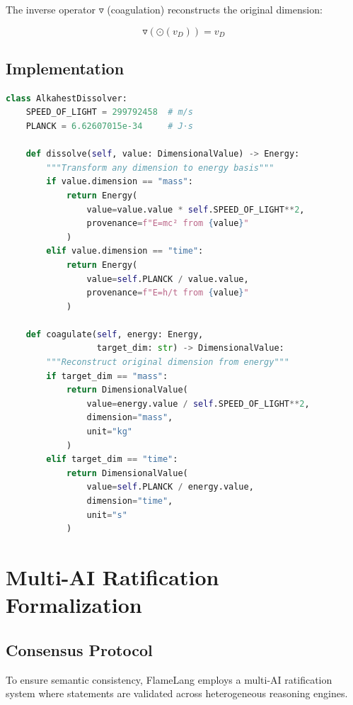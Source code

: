 \documentclass[11pt,a4paper]{article}
\begin{document}
The inverse operator $\triangledown$ (coagulation) reconstructs the original dimension:

\begin{equation}
\triangledown(\odot(v_D)) = v_D
\end{equation}

\subsection{Implementation}

\begin{lstlisting}[language=Python, caption=Alkahest Dissolution]
class AlkahestDissolver:
    SPEED_OF_LIGHT = 299792458  # m/s
    PLANCK = 6.62607015e-34     # J⋅s
    
    def dissolve(self, value: DimensionalValue) -> Energy:
        """Transform any dimension to energy basis"""
        if value.dimension == "mass":
            return Energy(
                value=value.value * self.SPEED_OF_LIGHT**2,
                provenance=f"E=mc² from {value}"
            )
        elif value.dimension == "time":
            return Energy(
                value=self.PLANCK / value.value,
                provenance=f"E=h/t from {value}"
            )
    
    def coagulate(self, energy: Energy, 
                  target_dim: str) -> DimensionalValue:
        """Reconstruct original dimension from energy"""
        if target_dim == "mass":
            return DimensionalValue(
                value=energy.value / self.SPEED_OF_LIGHT**2,
                dimension="mass",
                unit="kg"
            )
        elif target_dim == "time":
            return DimensionalValue(
                value=self.PLANCK / energy.value,
                dimension="time",
                unit="s"
            )
\end{lstlisting}

\section{Multi-AI Ratification Formalization}

\subsection{Consensus Protocol}

To ensure semantic consistency, FlameLang employs a multi-AI ratification system where statements are validated across heterogeneous reasoning engines.
\end{document}
